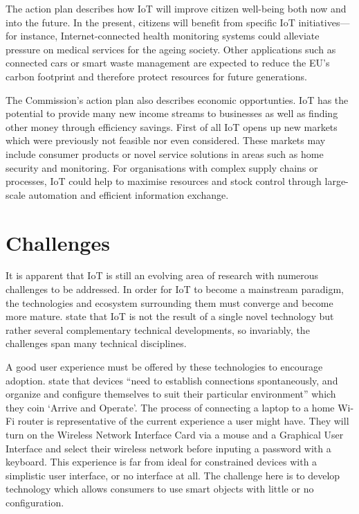    The action plan \citep{ECIoT:2009} describes how IoT will improve citizen well-being both now and into the future. In the present, citizens will benefit from specific IoT initiatives---for instance, Internet-connected health monitoring systems could alleviate pressure on medical services for the ageing society. Other applications such as connected cars or smart waste management are expected to reduce the EU's carbon footprint and therefore protect resources for future generations.

    The Commission's action plan also describes economic opportunties. IoT has the potential to provide many new income streams to businesses as well as finding other money through efficiency savings. First of all IoT opens up new markets which were previously not feasible nor even considered. These markets may include consumer products or novel service solutions in areas such as home security and monitoring. For organisations with complex supply chains or processes, IoT could help to maximise resources and stock control through large-scale automation and efficient information exchange.

  \section{Challenges}
    It is apparent that IoT is still an evolving area of research with numerous challenges to be addressed. In order for IoT to become a mainstream paradigm, the technologies and ecosystem surrounding them must converge and become more mature. \citet{fromIoC} state that IoT is not the result of a single novel technology but rather several complementary technical developments, so invariably, the challenges span many technical disciplines. 

    A good user experience must be offered by these technologies to encourage adoption. \citet{fromIoC} state that devices ``need to establish connections spontaneously, and organize and configure themselves to suit their particular environment'' which they coin `Arrive and Operate'. The process of connecting a laptop to a home Wi-Fi router is representative of the current experience a user might have. They will turn on the Wireless Network Interface Card via a mouse and a Graphical User Interface and select their wireless network before inputing a password with a keyboard. This experience is far from ideal for constrained devices with a simplistic user interface, or no interface at all. The challenge here is to develop technology which allows consumers to use smart objects with little or no configuration.

